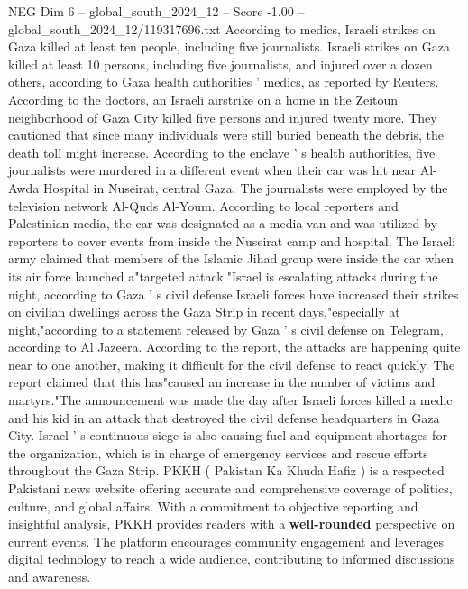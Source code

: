 \begin{textsample}{NEG Dim 6 – global\_south\_2024\_12 – Score -1.00 – global\_south\_2024\_12/119317696.txt}  \label{ex:f6_neg_120}
According to medics, Israeli strikes on Gaza killed at least ten people, including five journalists.
Israeli strikes on Gaza killed at least 10 persons, including five journalists, and injured over a dozen others, according to Gaza health authorities ' medics, as reported by Reuters.
According to the doctors, an Israeli airstrike on a home in the Zeitoun neighborhood of Gaza City killed five persons and injured twenty more.
They cautioned that since many individuals were still buried beneath the debris, the death toll might increase.
According to the enclave ' s health authorities, five journalists were murdered in a different event when their car was hit near Al-Awda Hospital in Nuseirat, central Gaza.
The journalists were employed by the television network Al-Quds Al-Youm.
According to local reporters and Palestinian media, the car was designated as a media van and was utilized by reporters to cover events from inside the Nuseirat camp and hospital.
The Israeli army claimed that members of the Islamic Jihad group were inside the car when its air force launched a"targeted attack."Israel is escalating attacks during the night, according to Gaza ' s civil defense.Israeli forces have increased their strikes on civilian dwellings across the Gaza Strip in recent days,"especially at night,"according to a statement released by Gaza ' s civil defense on Telegram, according to Al Jazeera.
According to the report, the attacks are happening quite near to one another, making it difficult for the civil defense to react quickly.
The report claimed that this has"caused an increase in the number of victims and martyrs."The announcement was made the day after Israeli forces killed a medic and his kid in an attack that destroyed the civil defense headquarters in Gaza City.
Israel ' s continuous siege is also causing fuel and equipment shortages for the organization, which is in charge of emergency services and rescue efforts throughout the Gaza Strip.
PKKH ( Pakistan Ka Khuda Hafiz ) is a respected Pakistani news website offering accurate and comprehensive coverage of politics, culture, and global affairs.
With a commitment to objective reporting and insightful analysis, PKKH provides readers with a \textbf{well-rounded} perspective on current events.
The platform encourages community engagement and leverages digital technology to reach a wide audience, contributing to informed discussions and awareness.

\end{textsample}
